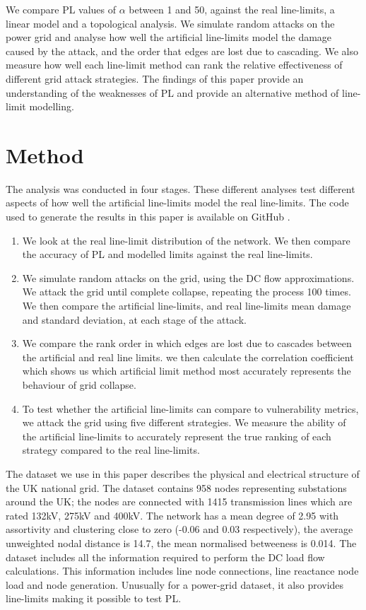 \documentclass{article}
\begin{document}
We compare PL values of $\alpha$ between 1 and 50, against the real line-limits, a linear model and a topological analysis. We simulate random attacks on the power grid and analyse how well the artificial line-limits model the damage caused by the attack, and the order that edges are lost due to cascading. We also measure how well each line-limit method can rank the relative effectiveness of different grid attack strategies. The findings of this paper provide an understanding of the weaknesses of PL and provide an alternative method of line-limit modelling.

\section{Method}
The analysis was conducted in four stages. These different analyses test different aspects of how well the artificial line-limits model the real line-limits. The code used to generate the results in this paper is available on GitHub \cite{ JonathanBourne2018,JonathanBourne2018a}.

\begin{enumerate}
    \item We look at the real line-limit distribution of the network. We then compare the accuracy of PL and modelled limits against the real line-limits.

    \item We simulate random attacks on the grid, using the DC flow approximations. We attack the grid until complete collapse, repeating the process 100 times. We then compare the artificial line-limits, and real line-limits mean damage and standard deviation, at each stage of the attack.  

    \item We compare the rank order in which edges are lost due to cascades between the artificial and real line limits. we then calculate the correlation coefficient which shows us which artificial limit method most accurately represents the behaviour of grid collapse.
    
    \item To test whether the artificial line-limits can compare to vulnerability metrics, we attack the grid using five different strategies. We measure the ability of the artificial line-limits to accurately represent the true ranking of each strategy compared to the real line-limits.
\end{enumerate}

The dataset we use in this paper describes the physical and electrical structure of the UK national grid. The dataset contains 958 nodes representing substations around the UK; the nodes are connected with 1415 transmission lines which are rated 132kV, 275kV and 400kV. The network has a mean degree of 2.95 with assortivity and clustering close to zero (-0.06 and 0.03 respectively), the average unweighted nodal distance is 14.7, the mean normalised betweeness is 0.014. The dataset includes all the information required to perform the DC load flow calculations. This information includes line node connections, line reactance node load and node generation. Unusually for a power-grid dataset, it also provides line-limits making it possible to test PL. 
\end{document}
